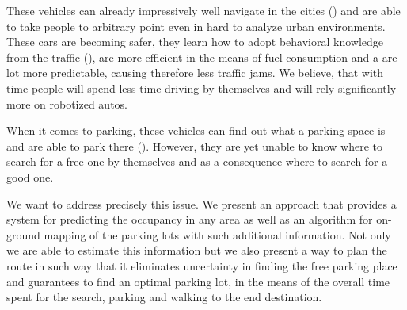     These vehicles can already impressively well navigate in the cities (\cite{stanley_auto_car,perceprion_drivec_car,lima13}) and are able to take people to arbitrary point even in hard to analyze urban environments. These cars are becoming safer, they learn how to adopt behavioral knowledge from the traffic (\cite{behaviour_learning,spinello10:multiclass}), are more efficient in the means of fuel consumption and a are lot more predictable, causing therefore less traffic jams. We believe, that with time people will spend less time driving by themselves and will rely significantly more on robotized autos.

    When it comes to parking, these vehicles can find out what a parking space is and are able to park there (\cite{auto_cars_burgard,auto_parking09,auto_park2_11}). However, they are yet unable to know where to search for a free one by themselves and as a consequence where to search for a good one.

    We want to address precisely this issue. We present an approach that provides a system for predicting the occupancy in any area as well as an algorithm for on-ground mapping of the parking lots with such additional information. Not only we are able to estimate this information but we also present a way to plan the route in such way that it eliminates uncertainty in finding the free parking place and guarantees to find an optimal parking lot, in the means of the overall time spent for the search, parking and walking to the end destination.
